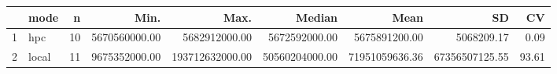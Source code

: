 \begin{table}[ht]
\centering
\begin{tabular}{rlrrrrrrr}
  \hline
 & mode & n & Min. & Max. & Median & Mean & SD & CV \\ 
  \hline
1 & hpc &  10 & 5670560000.00 & 5682912000.00 & 5672592000.00 & 5675891200.00 & 5068209.17 & 0.09 \\ 
  2 & local &  11 & 9675352000.00 & 193712632000.00 & 50560204000.00 & 71951059636.36 & 67356507125.55 & 93.61 \\ 
   \hline
\end{tabular}
\end{table}
